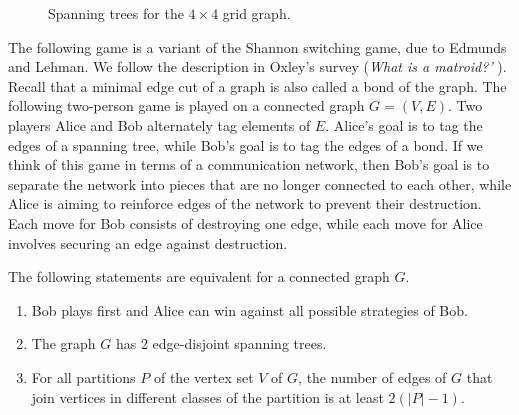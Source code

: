\begin{figure}[!htbp]
\centering
{}
\qquad
{}
\caption{Spanning trees for the $4 \times 4$ grid graph.}
\label{fig:trees_forests:grid_graph_spanning_trees}
\end{figure}

The following game is a variant of the Shannon switching game, due to
Edmunds and Lehman. We follow the description
in Oxley's survey ({\it What is a matroid?'}
{\color{red}{add reference later}}). Recall that a minimal edge cut of
a graph is also called a bond of the graph. The following
two-person game is played on a connected graph $G = (V,E)$. Two
players Alice and Bob alternately tag elements of $E$. Alice's goal is
to tag the edges of a spanning tree, while Bob's goal is to tag the
edges of a bond. If we think of this game in terms of a communication
network, then Bob's goal is to separate the network into pieces that
are no longer connected to each other, while Alice is aiming to
reinforce edges of the network to prevent their destruction. Each move
for Bob consists of destroying one edge, while each move for Alice
involves securing an edge against destruction.

\begin{theorem}
The following statements are equivalent for a connected graph $G$.
%
\begin{enumerate}
\item Bob plays first and Alice can win against all possible
  strategies of Bob.

\item The graph $G$ has 2 edge-disjoint spanning trees.

\item For all partitions $P$ of the vertex set $V$ of $G$, the number
  of edges of $G$ that join vertices in different classes of the
  partition is at least $2(|P| - 1)$.
\end{enumerate}
\end{theorem}

